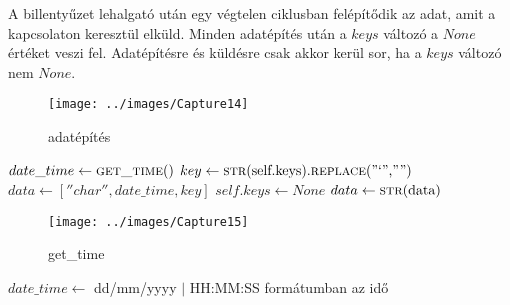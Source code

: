 \documentclass[a4paper, 11pt]{article}
\begin{document}
A billentyűzet lehalgató után egy végtelen ciklusban felépítődik az adat, amit a kapcsolaton keresztül elküld. Minden adatépítés után a $keys$ változó a $None$ értéket veszi fel. Adatépítésre és küldésre csak akkor kerül sor, ha a $keys$ változó nem $None$.
\begin{figure}[H]
\centering
\texttt{[image: ../images/Capture14]}
\caption{adatépítés}
\label{fig:databuild}
\end{figure}
\begin{algorithmic}[H]
	\State $date\_time \gets \Call{get\_time}{$$}$
	\State $key \gets \Call{str}{$self.keys$}.\Call{replace}{$''`'',''''$}$
	\State $data \gets [''char'', date\_time, key]$
	\State $self.keys \gets None$
	\State $data \gets \Call{str}{$data$}$
\EndIf
\end{algorithmic}
\begin{figure}[H]
\centering
\texttt{[image: ../images/Capture15]}
\caption{get\_time}
\label{fig:gettime}
\end{figure}
\begin{algorithmic}[H]
	\State $date\_time \gets$ dd/mm/yyyy $|$ HH:MM:SS formátumban az idő
\EndFunction
\end{algorithmic}
\end{document}
